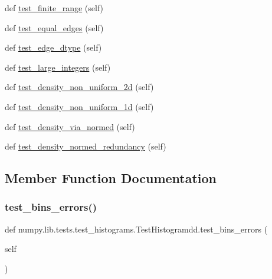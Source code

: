 \begin{DoxyCompactItemize}
def \hyperlink{classnumpy_1_1lib_1_1tests_1_1test__histograms_1_1TestHistogramdd_a26743702811f09a199ea35afb5568661}{test\+\_\+finite\+\_\+range} (self)
\item 
def \hyperlink{classnumpy_1_1lib_1_1tests_1_1test__histograms_1_1TestHistogramdd_a40ed80a0f9ceaf67a040119a0c98a8fe}{test\+\_\+equal\+\_\+edges} (self)
\item 
def \hyperlink{classnumpy_1_1lib_1_1tests_1_1test__histograms_1_1TestHistogramdd_a69e028b2e8429f8d08cc977fd02644d8}{test\+\_\+edge\+\_\+dtype} (self)
\item 
def \hyperlink{classnumpy_1_1lib_1_1tests_1_1test__histograms_1_1TestHistogramdd_ab42e6336c25883d67069666779e01490}{test\+\_\+large\+\_\+integers} (self)
\item 
def \hyperlink{classnumpy_1_1lib_1_1tests_1_1test__histograms_1_1TestHistogramdd_aa651f8a9359ac31a9268b655a5f77289}{test\+\_\+density\+\_\+non\+\_\+uniform\+\_\+2d} (self)
\item 
def \hyperlink{classnumpy_1_1lib_1_1tests_1_1test__histograms_1_1TestHistogramdd_a5b44c6da8e8f4be85a174f7686a98038}{test\+\_\+density\+\_\+non\+\_\+uniform\+\_\+1d} (self)
\item 
def \hyperlink{classnumpy_1_1lib_1_1tests_1_1test__histograms_1_1TestHistogramdd_a13f28167fee1556b0d1a705cda054011}{test\+\_\+density\+\_\+via\+\_\+normed} (self)
\item 
def \hyperlink{classnumpy_1_1lib_1_1tests_1_1test__histograms_1_1TestHistogramdd_a56f726253983f38f692aca76b9560552}{test\+\_\+density\+\_\+normed\+\_\+redundancy} (self)
\end{DoxyCompactItemize}


\subsection{Member Function Documentation}
\mbox{\label{classnumpy_1_1lib_1_1tests_1_1test__histograms_1_1TestHistogramdd_a658041fa4bb790fb6fa4ba4043851306}} 
\subsubsection{\texorpdfstring{test\+\_\+bins\+\_\+errors()}{test\_bins\_errors()}}
{\footnotesize\ttfamily def numpy.\+lib.\+tests.\+test\+\_\+histograms.\+Test\+Histogramdd.\+test\+\_\+bins\+\_\+errors (\begin{DoxyParamCaption}\item[{}]{self }\end{DoxyParamCaption})}

